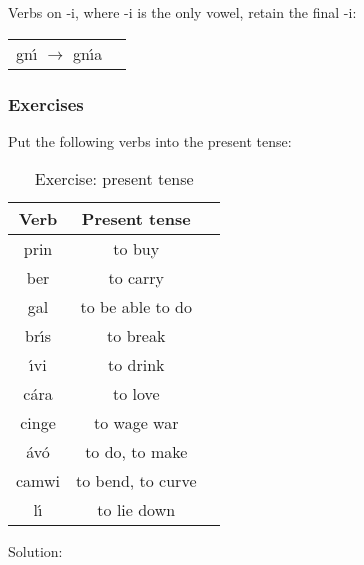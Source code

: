 Verbs on -i, where -i is the only vowel, retain the final -i:
\begin{table}[H]
\begin{tabu}{ll}
  gn\'{\i} $\rightarrow$ gn\'{\i}a
\end{tabu}
\label{examples_verbs_on_i_only_vowel}
\end{table}

\newpage
\subsubsection{Exercises}
Put the following verbs into the present tense:
\begin{table}[H]
\centering
\begin{tabu}{|c|c|p{10.0cm}|}
  \toprule
  \textbf{Verb} & \textbf{Present tense}\\
  \toprule
  prin & to buy & \\
  \midrule
  ber & to carry & \\
  \midrule
  gal & to be able to do & \\
  \midrule
  br\'{\i}s & to break & \\
  \midrule
  \'{\i}vi & to drink & \\
  \midrule
  c\'{a}ra & to love & \\
  \midrule
  cinge & to wage war & \\
  \midrule
  \'{a}v\'{o} & to do, to make & \\
  \midrule
  camwi & to bend, to curve & \\
  \midrule
  l\'{\i} & to lie down & \\
  \bottomrule
\end{tabu}
\caption{Exercise: present tense}
\label{exercise_present_tense}
\end{table}

\newpage
Solution:
\begin{table}[H]
\centering
{}
\label{solution_present_tense}
\caption{Solution: present tense}
\end{table}
\newpage


